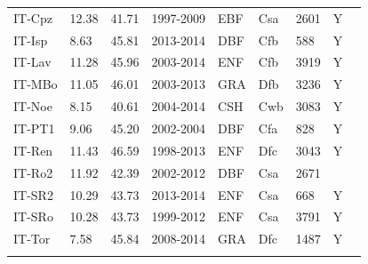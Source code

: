 \documentclass[gmd, manuscript]{copernicus}
\begin{document}
\begin{table}[t]
\begin{tabular}{lllllllll}
  IT-Cpz & 12.38 & 41.71 & 1997-2009 & EBF & Csa & 2601 & Y & \citet{IT-Cpz} \\ 
  IT-Isp & 8.63 & 45.81 & 2013-2014 & DBF & Cfb & 588 & Y & \citet{IT-Isp} \\ 
  IT-Lav & 11.28 & 45.96 & 2003-2014 & ENF & Cfb & 3919 & Y & \citet{IT-Lav} \\ 
  IT-MBo & 11.05 & 46.01 & 2003-2013 & GRA & Dfb & 3236 & Y & \citet{IT-MBo} \\ 
  IT-Noe & 8.15 & 40.61 & 2004-2014 & CSH & Cwb & 3083 & Y & \citet{IT-Noe} \\ 
  IT-PT1 & 9.06 & 45.20 & 2002-2004 & DBF & Cfa & 828 & Y & \citet{IT-PT1} \\ 
  IT-Ren & 11.43 & 46.59 & 1998-2013 & ENF & Dfc & 3043 & Y & \citet{IT-Ren} \\ 
  IT-Ro2 & 11.92 & 42.39 & 2002-2012 & DBF & Csa & 2671 &  & \citet{IT-Ro2} \\ 
  IT-SR2 & 10.29 & 43.73 & 2013-2014 & ENF & Csa & 668 & Y & \citet{IT-SR2} \\ 
  IT-SRo & 10.28 & 43.73 & 1999-2012 & ENF & Csa & 3791 & Y & \citet{IT-SRo} \\ 
  IT-Tor & 7.58 & 45.84 & 2008-2014 & GRA & Dfc & 1487 & Y & \citet{IT-Tor} \\ 
    \bottomhline
\end{tabular}
\label{tab:sites2}
\end{table}
\clearpage
\end{document}
